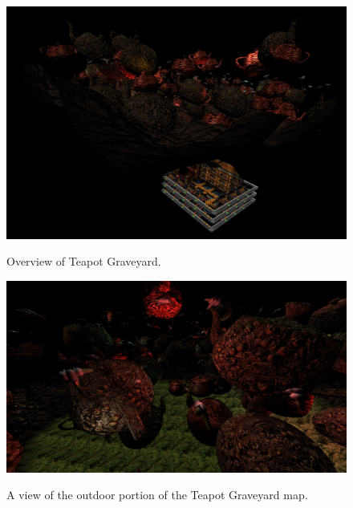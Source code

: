 \documentclass[12pt]{ucthesis}
\newcommand{\captionfonts}{\small\bf\ssp}
\begin{document}
\begin{figure}
\begin{center}
\includegraphics[width=\textwidth]{Images/GraveyardOverview.jpg}
\captionfonts
\caption[Teapot Graveyard Overview]{Overview of Teapot Graveyard.}
\label{fig:graveyard-overview}

\includegraphics[width=\textwidth]{Images/TeapotGraveyard.jpg}
\captionfonts
\caption[Teapot Graveyard]{A view of the outdoor portion of the Teapot Graveyard map.}
\label{fig:teapot-graveyard}
\end{center}
\end{figure}
\end{document}
